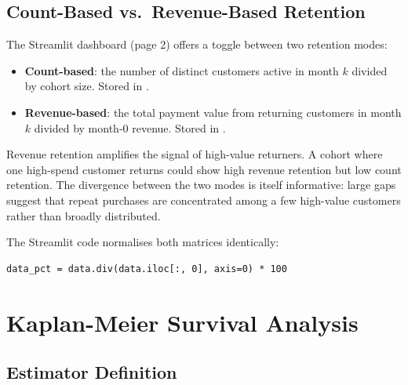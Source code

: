 \subsection{Count-Based vs.\ Revenue-Based Retention}

The Streamlit dashboard (page 2) offers a toggle between two retention modes:

\begin{itemize}
  \item \textbf{Count-based}: the number of distinct customers active in month $k$
    divided by cohort size. Stored in .
  \item \textbf{Revenue-based}: the total payment value from returning customers in
    month $k$ divided by month-0 revenue. Stored in
    .
\end{itemize}

Revenue retention amplifies the signal of high-value returners. A cohort where
one high-spend customer returns could show high revenue retention but low count
retention. The divergence between the two modes is itself informative: large
gaps suggest that repeat purchases are concentrated among a few high-value
customers rather than broadly distributed.

The Streamlit code normalises both matrices identically:
\begin{lstlisting}[style=python, caption={Normalisation to retention percentages (\filepath{streamlit/pages/2\_retencion\_cohortes.py}, line~90)}]
data_pct = data.div(data.iloc[:, 0], axis=0) * 100
\end{lstlisting}

\section{Kaplan-Meier Survival Analysis}
\label{sec:ecom-km}


\subsection{Estimator Definition}

